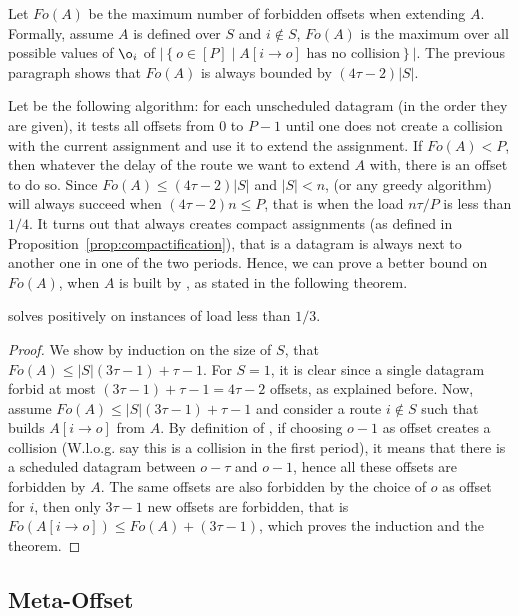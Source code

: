 Let $Fo(A)$ be the maximum number of forbidden offsets when extending $A$. Formally, assume $A$ is defined over $S$ and $i\notin S$, $Fo(A)$ is the maximum over all possible values of $\o_i$ of $|\left\{ o \in [P] \mid A[i \rightarrow o] \text{ has no collision}\right\}|$. The previous paragraph shows that $Fo(A)$ is always bounded by $(4 \tau -2)|S|$. 



Let \firstfit be the following algorithm:  for each unscheduled datagram (in the order they are given), it tests all offsets from $0$ to $P-1$ until one does not create a collision with the current assignment and use it to extend the assignment. If $Fo(A) < P$, then whatever the delay of the route we want to extend $A$ with, there is an offset to do so. Since $Fo(A) \leq (4 \tau -2)|S|$ and $|S| < n$, \firstfit (or any greedy algorithm) will always succeed when $(4 \tau -2)n \leq P$, that is when the load $ n\tau /P$ is less than $1/4$.
It turns out that \firstfit always creates compact assignments (as defined in Proposition~\ref{prop:compactification}), that is a datagram is always next to another one in one of the two periods. Hence, we can prove a better bound on $Fo(A)$, when $A$ is built by \firstfit, as stated in the following theorem.

\begin{theorem}
\firstfit solves \pma positively on instances of load less than $1/3$. 
\end{theorem}
\begin{proof}
We show by induction on the size of $S$, that $Fo(A) \leq |S|(3\tau -1) + \tau -1$. For $S = 1$, it is clear since a single datagram forbid at most $(3\tau -1) + \tau -1 = 4\tau-2$ offsets, as explained before. Now, assume $Fo(A) \leq |S|(3\tau -1) + \tau -1$ and consider a route $i \notin S$ such that \firstfit builds $A[i \rightarrow o]$ from $A$. By definition of \firstfit, if choosing $o-1$ as offset creates a collision (W.l.o.g. say this is a collision in the first period), it means that there is a scheduled datagram between $o - \tau $ and $o-1$, hence all these offsets are forbidden by $A$. The same offsets are also forbidden by the choice of $o$ as offset for $i$, then only $3\tau -1$ new offsets are forbidden, that is $Fo(A[i \rightarrow o]) \leq Fo(A) + (3\tau -1)$, which proves the induction and the theorem.
\end{proof}

\subsection{Meta-Offset}

